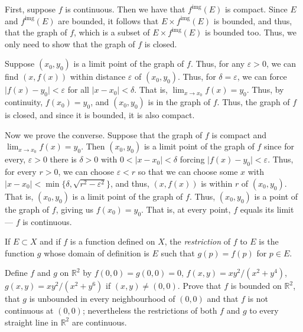 \documentclass[12 pt, letterpaper]{hmcpset}
\begin{document}
\begin{solution}
	First, suppose $f$ is continuous. Then we have that $f^{\text{img}}(E)$ is compact. Since $E$ and $f^{\text{img}}(E)$ are bounded, it follows that $E \times f^{\text{img}}(E)$ is bounded, and thus, that the graph of $f$, which is a subset of $E \times f^{\text{img}}(E)$ is bounded too. Thus, we only need to show that the graph of $f$ is closed. 

	Suppose $(x_{0}, y_{0})$ is a limit point of the graph of $f$. Thus, for any $\varepsilon > 0$, we can find $(x, f(x))$ within distance $\varepsilon$ of $(x_{0}, y_{0})$. Thus, for  $\delta = \varepsilon$, we can force  $\lvert f(x) - y_{0} \rvert < \varepsilon$ for all $\lvert x - x_{0} \rvert < \delta$. That is, $\lim_{x \to x_{0}} f(x) = y_{0}$. Thus, by continuity, $f(x_{0}) = y_{0}$, and $(x_{0}, y_{0})$ is in the graph of $f$. Thus, the graph of $f$ is closed, and since it is bounded, it is also compact.

	Now we prove the converse. Suppose that the graph of $f$ is compact and $\lim_{x \to x_{0}} f(x) = y_{0}$. Then $(x_{0}, y_{0})$ is a limit point of the graph of $f$ since for every, $\varepsilon > 0$ there is $\delta > 0$ with $0 < \lvert x - x_{0} \rvert < \delta$ forcing $\lvert f(x) - y_{0} \rvert < \varepsilon$. Thus, for every $r > 0$, we can choose $\varepsilon < r$ so that we can choose some $x$ with $\lvert x - x_{0} \rvert < \min \{ \delta, \sqrt{r^{2} - \varepsilon^{2}} \}$, and thus, $(x, f(x))$ is within $r$ of $(x_{0}, y_{0})$. That is, $(x_{0}, y_{0})$ is a limit point of the graph of $f$. Thus, $(x_{0}, y_{0})$ is a point of the graph of $f$, giving us $f(x_{0}) = y_{0}$. That is, at every point, $f$ equals its limit --- $f$ is continuous.
\end{solution}

\pagebreak

\begin{problem}
	If $E \subset X$ and if $f$ is a function defined on $X$, the \emph{restriction} of $f$ to $E$ is the function $g$ whose domain of definition is  $E$ such that $g(p) = f(p)$ for $p \in E$.

	Define $f$ and $g$ on $\mathbb{R}^{2}$ by $f(0, 0) = g(0, 0) = 0$, $f(x, y) = xy^{2} / (x^{2} + y^{4})$, $g(x, y) = x y^{2}/(x^{2} + y^{6})$ if $(x, y) \neq (0, 0)$. Prove that $f$ is bounded on $\mathbb{R}^{2}$, that $g$ is unbounded in every neighbourhood of $(0, 0)$ and that $f$ is not continuous at $(0, 0)$; nevertheless the restrictions of both $f$ and $g$ to every straight line in $\mathbb{R}^{2}$ are continuous.
\end{problem}
\end{document}
